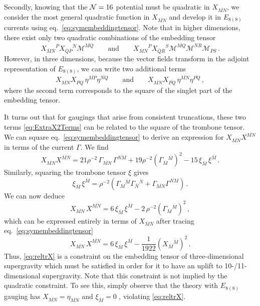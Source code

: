 \documentclass[a4paper, 11pt]{article}
\numberwithin{equation}{section}
\newcommand{\ov}[1]{\overline{#1}}
\newcommand{\EE}{\ensuremath{E_{8(8)}}\xspace}
\newcommand{\En}[1]{E_{#1(#1)}}
\newcommand{\+}{\oplus}
\newcommand{\gM}{\mathcal{M}}
\newcommand{\fl}[1]{\ov{#1}}
\begin{document}
Secondly, knowing that the ${\cal N}=16$ potential must be quadratic in $X_{\fl{MN}}$, we consider the most general quadratic function in $X_{\fl{MN}}$ and develop it in \EE currents using eq.~\eqref{eq:symembeddingtensor}. Note that in higher dimensions, there exist only two quadratic combinations of the embedding tensor
\begin{equation}
	X_{\fl{M}\fl{N}}{}^{\fl{P}} X_{\fl{Q}\fl{P}}{}^{\fl{N}} \gM^{\fl{MQ}} \qquad \text{and} \qquad X_{\fl{M}\fl{N}}{}^{\fl{P}} X_{\fl{Q}\fl{R}}{}^{\fl{S}} \gM^{\fl{MQ}} \gM^{\fl{N}\fl{R}} \gM_{\fl{P}\fl{S}} \,.
\end{equation}
However, in three dimensions, because the vector fields transform in the adjoint representation of $\EE$, we can write two additional terms
\begin{equation} \label{eq:ExtraX2Terms}
	X_{\fl{MN}} X_{\fl{PQ}}\, \eta^{\fl{MP}} \eta^{\fl{NQ}} \qquad \text{and} \qquad X_{\fl{MN}} X_{\fl{PQ}}\, \eta^{\fl{MN}} \eta^{\fl{PQ}} \,,
\end{equation}
where the second term corresponds to the square of the singlet part of the embedding tensor.

It turns out that for gaugings that arise from consistent truncations, these two terms \eqref{eq:ExtraX2Terms} can be related to the square of the trombone tensor. We can square eq.~\eqref{eq:symembeddingtensor} to derive an expression for $X_{\ov{MN}}X^{\ov{MN}}$ in terms of the current $\Gamma$. We find
\begin{equation}\label{eq:XXwitheta}
	X_{\ov{MN}}X^{\ov{MN}} = 21 \rho^{-2}\, \Gamma_{\ov{MN}}\, \Gamma^{\ov{NM}} + 19 \rho^{-2}\left(\Gamma_{\ov M}{}^{\ov M}\right)^2 - 15\, \xi_{\ov{M}}\, \xi^{\ov{M}} \,.
\end{equation}
Similarly, squaring the trombone tensor $\xi$ gives
\begin{equation}\label{eq:xixiwitheta}
	\xi_{\ov M}\,\xi^{\ov M}=\rho^{-2}\left(\Gamma_{\ov M}{}^{\ov M}\Gamma_{\ov N}{}^{\ov N}+\Gamma_{\ov{MN}}\Gamma^{\ov{NM}}\right) \,.
\end{equation}
We can now deduce
\begin{equation}
	X_{\ov{MN}} \,X^{\ov{MN}}= 6\, \xi_{\ov M} \, \xi^{\ov M} - 2\, \rho^{-2}\left(\Gamma_{\ov M}{}^{\ov M}\right)^2 \,,
\end{equation}
which can be expressed entirely in terms of $X_{\fl{M}\fl{N}}$ after tracing eq.~\eqref{eq:symembeddingtensor}
\begin{equation}\label{eq:reltrX}
	X_{\ov{MN}}\,X^{\ov{MN}} = 6\, \xi_{\ov M}\, \xi^{\ov M} - \frac1{1922}\left(X_{\ov M}{}^{\ov M}\right)^2 \,. 
\end{equation}
Thus, \eqref{eq:reltrX} is a constraint on the embedding tensor of three-dimensional supergravity which must be satisfied in order for it to have an uplift to 10-/11-dimensional supergravity. Note that this constraint is not implied by the quadratic constraint. To see this, simply observe that the theory with $\En{8}$ gauging has $X_{\ov{MN}}=\eta_{\ov{MN}}$ and $\xi_{\fl{M}} = 0$ \cite{Nicolai:2000sc,Nicolai:2001sv}, violating \eqref{eq:reltrX}.
\end{document}
